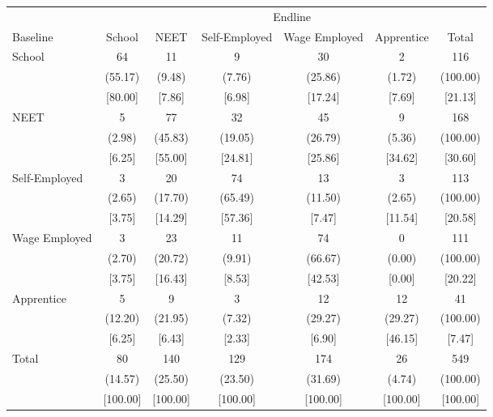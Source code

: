 {
\def\sym#1{\ifmmode^{#1}\else\(^{#1}\)\fi}
\begin{tabular}{l*{6}{c}}
\hline\hline
            &\multicolumn{6}{c}{Endline}                                                  \\
Baseline    &      School&        NEET&Self-Employed&Wage Employed&  Apprentice&       Total\\
\hline
School      &          64&          11&           9&          30&           2&         116\\
            &     (55.17)&      (9.48)&      (7.76)&     (25.86)&      (1.72)&    (100.00)\\
            &     [80.00]&      [7.86]&      [6.98]&     [17.24]&      [7.69]&     [21.13]\\
NEET        &           5&          77&          32&          45&           9&         168\\
            &      (2.98)&     (45.83)&     (19.05)&     (26.79)&      (5.36)&    (100.00)\\
            &      [6.25]&     [55.00]&     [24.81]&     [25.86]&     [34.62]&     [30.60]\\
Self-Employed&           3&          20&          74&          13&           3&         113\\
            &      (2.65)&     (17.70)&     (65.49)&     (11.50)&      (2.65)&    (100.00)\\
            &      [3.75]&     [14.29]&     [57.36]&      [7.47]&     [11.54]&     [20.58]\\
Wage Employed&           3&          23&          11&          74&           0&         111\\
            &      (2.70)&     (20.72)&      (9.91)&     (66.67)&      (0.00)&    (100.00)\\
            &      [3.75]&     [16.43]&      [8.53]&     [42.53]&      [0.00]&     [20.22]\\
Apprentice  &           5&           9&           3&          12&          12&          41\\
            &     (12.20)&     (21.95)&      (7.32)&     (29.27)&     (29.27)&    (100.00)\\
            &      [6.25]&      [6.43]&      [2.33]&      [6.90]&     [46.15]&      [7.47]\\
Total       &          80&         140&         129&         174&          26&         549\\
            &     (14.57)&     (25.50)&     (23.50)&     (31.69)&      (4.74)&    (100.00)\\
            &    [100.00]&    [100.00]&    [100.00]&    [100.00]&    [100.00]&    [100.00]\\
\hline\hline
\end{tabular}
}
